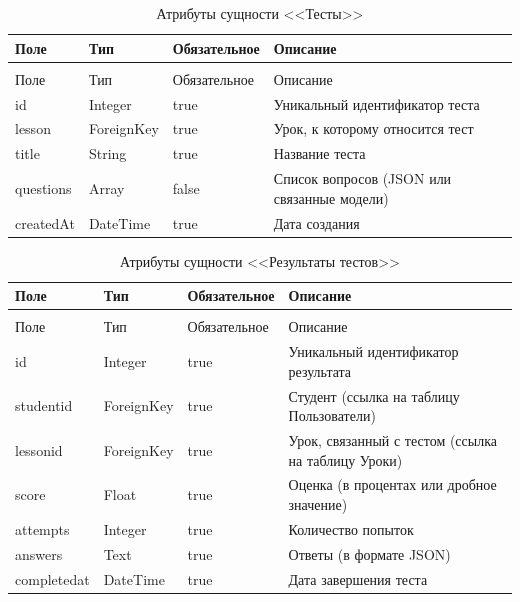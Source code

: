 \begin{xltabular}{\textwidth}{|l|l|p{3.2cm}|X|}
	\caption{Атрибуты сущности <<Тесты>>\label{tests:table}}\\ \hline
	Поле & Тип & Обязательное & Описание \\ \hline
	\endfirsthead
	\\ \hline
	Поле & Тип & Обязательное & Описание \\ \hline
	\endhead
	id & Integer & true & Уникальный идентификатор теста \\ \hline
	lesson & ForeignKey & true & Урок, к которому относится тест \\ \hline
	title & String & true & Название теста \\ \hline
	questions & Array & false & Список вопросов (JSON или связанные модели) \\ \hline
	createdAt & DateTime & true & Дата создания \\ \hline
\end{xltabular}

\begin{xltabular}{\textwidth}{|l|l|p{3.2cm}|X|}
	\caption{Атрибуты сущности <<Результаты тестов>>\label{test_results:table}}\\ \hline
	Поле & Тип & Обязательное & Описание \\ \hline
	\endfirsthead
	\\ \hline
	Поле & Тип & Обязательное & Описание \\ \hline
	\endhead
	id & Integer & true & Уникальный идентификатор результата \\ \hline
	studentid & ForeignKey & true & Студент (ссылка на таблицу Пользователи) \\ \hline
	lessonid & ForeignKey & true & Урок, связанный с тестом (ссылка на таблицу Уроки) \\ \hline
	score & Float & true & Оценка (в процентах или дробное значение) \\ \hline
	attempts & Integer & true & Количество попыток \\ \hline
	answers & Text & true & Ответы (в формате JSON) \\ \hline
	completedat & DateTime & true & Дата завершения теста \\ \hline
\end{xltabular}

